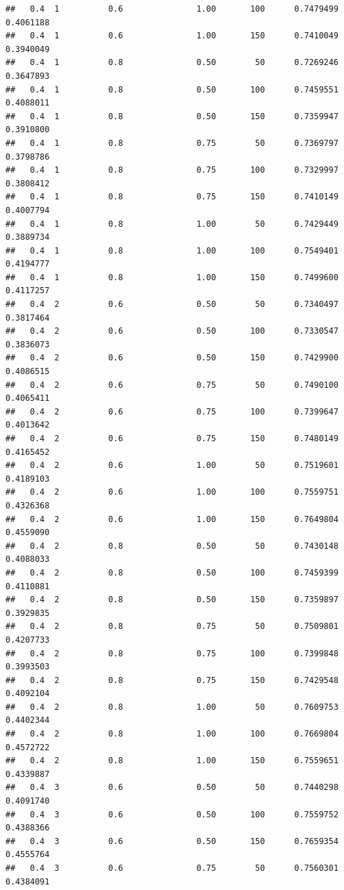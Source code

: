 \documentclass[
]{book}
\theoremstyle{break}
\theoremstyle{definition}
\theoremstyle{definition}
\theoremstyle{definition}
\theoremstyle{definition}
\theoremstyle{remark}
\begin{document}
\begin{verbatim}
##   0.4  1          0.6               1.00       100      0.7479499  0.4061188
##   0.4  1          0.6               1.00       150      0.7410049  0.3940049
##   0.4  1          0.8               0.50        50      0.7269246  0.3647893
##   0.4  1          0.8               0.50       100      0.7459551  0.4088011
##   0.4  1          0.8               0.50       150      0.7359947  0.3910800
##   0.4  1          0.8               0.75        50      0.7369797  0.3798786
##   0.4  1          0.8               0.75       100      0.7329997  0.3808412
##   0.4  1          0.8               0.75       150      0.7410149  0.4007794
##   0.4  1          0.8               1.00        50      0.7429449  0.3889734
##   0.4  1          0.8               1.00       100      0.7549401  0.4194777
##   0.4  1          0.8               1.00       150      0.7499600  0.4117257
##   0.4  2          0.6               0.50        50      0.7340497  0.3817464
##   0.4  2          0.6               0.50       100      0.7330547  0.3836073
##   0.4  2          0.6               0.50       150      0.7429900  0.4086515
##   0.4  2          0.6               0.75        50      0.7490100  0.4065411
##   0.4  2          0.6               0.75       100      0.7399647  0.4013642
##   0.4  2          0.6               0.75       150      0.7480149  0.4165452
##   0.4  2          0.6               1.00        50      0.7519601  0.4189103
##   0.4  2          0.6               1.00       100      0.7559751  0.4326368
##   0.4  2          0.6               1.00       150      0.7649804  0.4559090
##   0.4  2          0.8               0.50        50      0.7430148  0.4088033
##   0.4  2          0.8               0.50       100      0.7459399  0.4110881
##   0.4  2          0.8               0.50       150      0.7359897  0.3929835
##   0.4  2          0.8               0.75        50      0.7509801  0.4207733
##   0.4  2          0.8               0.75       100      0.7399848  0.3993503
##   0.4  2          0.8               0.75       150      0.7429548  0.4092104
##   0.4  2          0.8               1.00        50      0.7609753  0.4402344
##   0.4  2          0.8               1.00       100      0.7669804  0.4572722
##   0.4  2          0.8               1.00       150      0.7559651  0.4339887
##   0.4  3          0.6               0.50        50      0.7440298  0.4091740
##   0.4  3          0.6               0.50       100      0.7559752  0.4388366
##   0.4  3          0.6               0.50       150      0.7659354  0.4555764
##   0.4  3          0.6               0.75        50      0.7560301  0.4384091

\end{verbatim}
\end{document}
